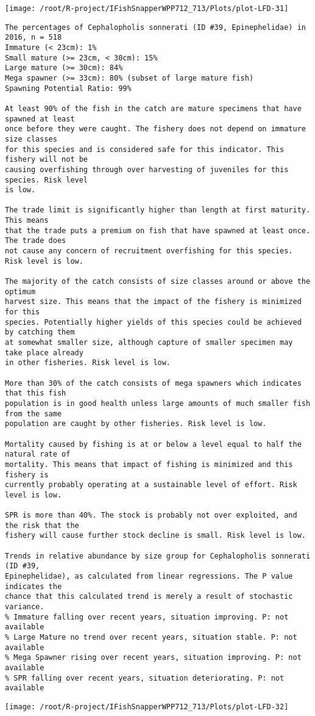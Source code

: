 \documentclass{report}\usepackage[]{graphicx}\usepackage[]{color}
\makeatletter
\def\maxwidth{ %
  \ifdim\Gin@nat@width>\linewidth
    \linewidth
  \else
    \Gin@nat@width
  \fi
}
\newenvironment{kframe}{%
 \def\at@end@of@kframe{}%
 \ifinner\ifhmode%
  \def\at@end@of@kframe{\end{minipage}}%
  \begin{minipage}{\columnwidth}%
 \fi\fi%
 \def\FrameCommand##1{\hskip\@totalleftmargin \hskip-\fboxsep
 \colorbox{shadecolor}{##1}\hskip-\fboxsep
     \hskip-\linewidth \hskip-\@totalleftmargin \hskip\columnwidth}%
 \MakeFramed {\advance\hsize-\width
   \@totalleftmargin\z@ \linewidth\hsize
   \@setminipage}}%
 {\par\unskip\endMakeFramed%
 \at@end@of@kframe}
\newenvironment{knitrout}{}{} %
\makeatother
\begin{document}
\begin{knitrout}
\texttt{[image: /root/R-project/IFishSnapperWPP712\_713/Plots/plot-LFD-31]} 
\begin{kframe}\begin{verbatim}
The percentages of Cephalopholis sonnerati (ID #39, Epinephelidae) in 2016, n = 518
Immature (< 23cm): 1%
Small mature (>= 23cm, < 30cm): 15%
Large mature (>= 30cm): 84%
Mega spawner (>= 33cm): 80% (subset of large mature fish)
Spawning Potential Ratio: 99%
 
At least 90% of the fish in the catch are mature specimens that have spawned at least
once before they were caught. The fishery does not depend on immature size classes
for this species and is considered safe for this indicator. This fishery will not be
causing overfishing through over harvesting of juveniles for this species. Risk level
is low.

The trade limit is significantly higher than length at first maturity.  This means
that the trade puts a premium on fish that have spawned at least once. The trade does
not cause any concern of recruitment overfishing for this species. Risk level is low.

The majority of the catch consists of size classes around or above the optimum
harvest size. This means that the impact of the fishery is minimized for this
species. Potentially higher yields of this species could be achieved by catching them
at somewhat smaller size, although capture of smaller specimen may take place already
in other fisheries. Risk level is low.

More than 30% of the catch consists of mega spawners which indicates that this fish
population is in good health unless large amounts of much smaller fish from the same
population are caught by other fisheries. Risk level is low.
 
Mortality caused by fishing is at or below a level equal to half the natural rate of
mortality. This means that impact of fishing is minimized and this fishery is
currently probably operating at a sustainable level of effort. Risk level is low.
 
SPR is more than 40%. The stock is probably not over exploited, and the risk that the
fishery will cause further stock decline is small. Risk level is low.
 
Trends in relative abundance by size group for Cephalopholis sonnerati (ID #39,
Epinephelidae), as calculated from linear regressions. The P value indicates the
chance that this calculated trend is merely a result of stochastic variance.
% Immature falling over recent years, situation improving. P: not available
% Large Mature no trend over recent years, situation stable. P: not available
% Mega Spawner rising over recent years, situation improving. P: not available
% SPR falling over recent years, situation deteriorating. P: not available
\end{verbatim}
\end{kframe}
\texttt{[image: /root/R-project/IFishSnapperWPP712\_713/Plots/plot-LFD-32]} 


\end{knitrout}
\end{document}
